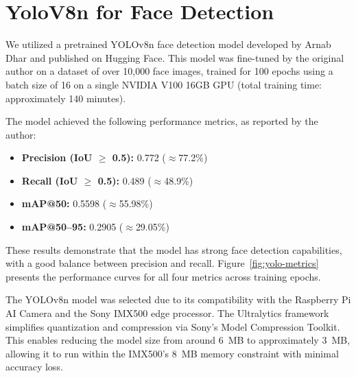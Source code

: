 \clearpage
\section{YoloV8n for Face Detection}
We utilized a pretrained YOLOv8n face detection model developed by Arnab Dhar and published on Hugging Face. This model was fine-tuned by the original author on a dataset of over 10{,}000 face images, trained for 100 epochs using a batch size of 16 on a single NVIDIA V100 16GB GPU (total training time: approximately 140 minutes).

The model achieved the following performance metrics, as reported by the author:

\begin{itemize}
	\item \textbf{Precision (IoU $\geq$ 0.5):} 0.772 ($\approx$77.2\%)
	\item \textbf{Recall (IoU $\geq$ 0.5):} 0.489 ($\approx$48.9\%)
	\item \textbf{mAP@50:} 0.5598 ($\approx$55.98\%)
	\item \textbf{mAP@50--95:} 0.2905 ($\approx$29.05\%)
\end{itemize}


These results demonstrate that the model has strong face detection capabilities, with a good balance between precision and recall. Figure~\ref{fig:yolo-metrics} presents the performance curves for all four metrics across training epochs.

The YOLOv8n model was selected due to its compatibility with the Raspberry Pi AI Camera and the Sony IMX500 edge processor. The Ultralytics framework simplifies quantization and compression via Sony’s Model Compression Toolkit. This enables reducing the model size from around 6~MB to approximately 3~MB, allowing it to run within the IMX500’s 8~MB memory constraint with minimal accuracy loss.

